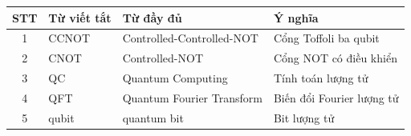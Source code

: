 \begin{table}[h]
\centering
\renewcommand{\arraystretch}{1.3}
\begin{tabular}{|c|l|l|p{5.5cm}|}
\hline
\textbf{STT} & \textbf{Từ viết tắt} & \textbf{Từ đầy đủ} & \textbf{Ý nghĩa} \\
\hline
1 & CCNOT & Controlled-Controlled-NOT & Cổng Toffoli ba qubit \\
\hline
2 & CNOT  & Controlled-NOT            & Cổng NOT có điều khiển \\
\hline
3 & QC    & Quantum Computing         & Tính toán lượng tử \\
\hline
4 & QFT   & Quantum Fourier Transform & Biến đổi Fourier lượng tử \\
\hline
5 & qubit & quantum bit               & Bit lượng tử \\
\hline
\end{tabular}
\end{table}